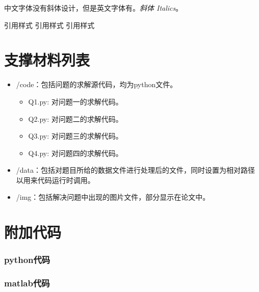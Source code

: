 \documentclass{cumcmthesis} %
\begin{document}
中文字体没有斜体设计，但是英文字体有。\textit{斜体 Italics}。


引用样式\cite{司守奎} 引用样式 引用样式\supercite{ts2}


\newpage 

\begin{center}
\end{center}

\newpage
\begin{appendices}

    \section{支撑材料列表}

    \begin{itemize}
        \item /code：包括问题的求解源代码，均为python文件。
              \begin{itemize}
                  \item Q1.py: 对问题一的求解代码。
                  \item Q2.py: 对问题二的求解代码。
                  \item Q3.py: 对问题三的求解代码。
                  \item Q4.py: 对问题四的求解代码。
              \end{itemize}
        \item /data：包括对题目所给的数据文件进行处理后的文件，同时设置为相对路径以用来代码运行时调用。
        \item /img：包括解决问题中出现的图片文件，部分显示在论文中。
    \end{itemize}

    \section{附加代码}


    \subsubsection*{python代码}
    

    \subsubsection*{matlab代码}
    

\end{appendices}
\end{document}
